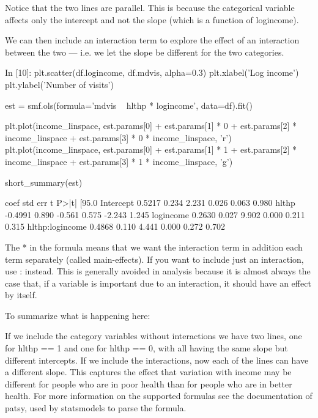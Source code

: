 \begin{frame}[fragile]
	\Large
Notice that the two lines are parallel. This is because the categorical variable affects only the intercept and not the slope (which is a function of logincome).

We can then include an interaction term to explore the effect of an interaction between the two — i.e. we let the slope be different for the two categories.
\end{frame}

\begin{frame}[fragile]
	\Large
In [10]:
plt.scatter(df.logincome, df.mdvis, alpha=0.3)
plt.xlabel('Log income')
plt.ylabel('Number of visits')

est = smf.ols(formula='mdvis ~ hlthp * logincome', data=df).fit()

plt.plot(income_linspace, est.params[0] + est.params[1] * 0 + est.params[2] * income_linspace + 
         est.params[3] * 0 * income_linspace, 'r')
plt.plot(income_linspace, est.params[0] + est.params[1] * 1 + est.params[2] * income_linspace + 
         est.params[3] * 1 * income_linspace, 'g')

short_summary(est)
\end{frame}

\begin{frame}[fragile]
	\Large
coef	std err	t	P>|t|	[95.0%
Intercept	0.5217	0.234	2.231	0.026	0.063 0.980
hlthp	-0.4991	0.890	-0.561	0.575	-2.243 1.245
logincome	0.2630	0.027	9.902	0.000	0.211 0.315
hlthp:logincome	0.4868	0.110	4.441	0.000	0.272 0.702

The * in the formula means that we want the interaction term in addition each term separately (called main-effects). If you want to include just an interaction, use : instead. This is generally avoided in analysis because it is almost always the case that, if a variable is important due to an interaction, it should have an effect by itself.
\end{frame}

\begin{frame}[fragile]
	\Large
To summarize what is happening here:

If we include the category variables without interactions we have two lines, one for hlthp == 1 and one for hlthp == 0, with all having the same slope but different intercepts.
If we include the interactions, now each of the lines can have a different slope. This captures the effect that variation with income may be different for people who are in poor health than for people who are in better health.
For more information on the supported formulas see the documentation of patsy, used by statsmodels to parse the formula.
\end{frame}

